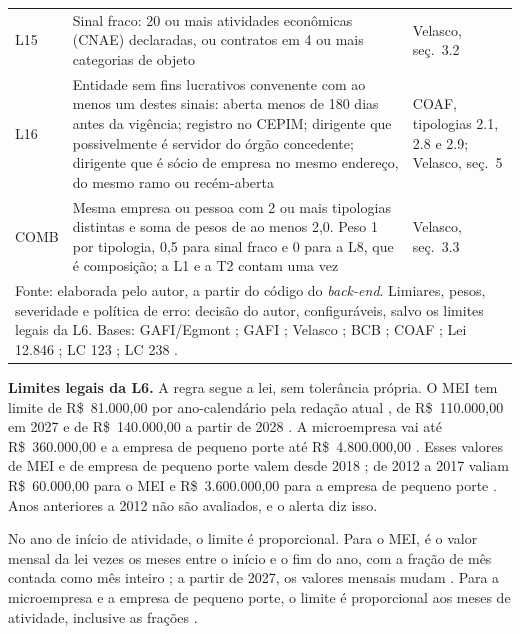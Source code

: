 \begin{small}
\begin{longtable}{p{1.3cm}p{8.4cm}p{4.6cm}}
L15 & Sinal fraco: 20 ou mais atividades econômicas (CNAE) declaradas, ou contratos em 4 ou mais categorias de objeto & Velasco, seç.~3.2 \\
L16 & Entidade sem fins lucrativos convenente com ao menos um destes sinais: aberta menos de 180 dias antes da vigência; registro no CEPIM; dirigente que possivelmente é servidor do órgão concedente; dirigente que é sócio de empresa no mesmo endereço, do mesmo ramo ou recém-aberta & COAF, tipologias 2.1, 2.8 e 2.9; Velasco, seç.~5 \\
COMB & Mesma empresa ou pessoa com 2 ou mais tipologias distintas e soma de pesos de ao menos 2,0. Peso 1 por tipologia, 0,5 para sinal fraco e 0 para a L8, que é composição; a L1 e a T2 contam uma vez & Velasco, seç.~3.3 \\
\hline
\multicolumn{3}{p{14.3cm}}{\footnotesize Fonte: elaborada pelo autor, a partir do código do \textit{back-end}. Limiares, pesos, severidade e política de erro: decisão do autor, configuráveis, salvo os limites legais da L6. Bases: GAFI/Egmont \cite{fatfegmont2018}; GAFI \cite{fatf2011corruption}; Velasco \cite{velasco2021}; BCB \cite{bcb2020cc4001}; COAF \cite{coaf2021casos}; Lei 12.846 \cite{brasil2013lei12846}; LC 123 \cite{brasil2006lcp123}; LC 238 \cite{brasil2026lcp238}.}\\
\end{longtable}
\end{small}

\textbf{Limites legais da L6.} A regra segue a lei, sem tolerância própria.
O MEI tem limite de R\$~81.000,00 por ano-calendário pela redação atual
\cite[art.~18-A, § 1º]{brasil2006lcp123}, de R\$~110.000,00 em 2027
\cite[art.~2º]{brasil2026lcp238} e de R\$~140.000,00 a partir de 2028
\cite[arts.~1º e 10, I]{brasil2026lcp238}. A microempresa vai até
R\$~360.000,00 e a empresa de pequeno porte até R\$~4.800.000,00
\cite[art.~3º, I e II]{brasil2006lcp123}. Esses valores de MEI e de empresa
de pequeno porte valem desde 2018 \cite[art.~11, III]{brasil2016lcp155}; de
2012 a 2017 valiam R\$~60.000,00 para o MEI e R\$~3.600.000,00 para a
empresa de pequeno porte \cite[art.~7º]{brasil2011lcp139}. Anos anteriores a
2012 não são avaliados, e o alerta diz isso.

No ano de início de atividade, o limite é proporcional. Para o MEI, é o
valor mensal da lei vezes os meses entre o início e o fim do ano, com a
fração de mês contada como mês inteiro \cite[art.~18-A, § 2º]{brasil2006lcp123};
a partir de 2027, os valores mensais mudam \cite[arts.~1º e 2º]{brasil2026lcp238}.
Para a microempresa e a empresa de pequeno porte, o limite é proporcional
aos meses de atividade, inclusive as frações \cite[art.~3º, § 2º]{brasil2006lcp123}.

